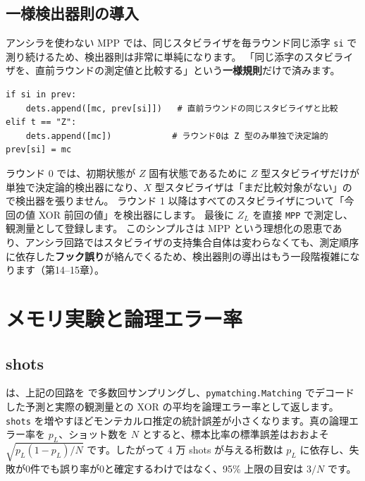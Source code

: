 \subsection{一様検出器則の導入}

アンシラを使わない MPP では、同じスタビライザを毎ラウンド同じ添字 \texttt{si} で測り続けるため、検出器則は非常に単純になります。
「同じ添字のスタビライザを、直前ラウンドの測定値と比較する」という\textbf{一様規則}だけで済みます。

\begin{lstlisting}[caption={一様検出器則（\codepath{src/stages/01_mpp/src/ftqc/surface_patch.py} の \texttt{mpp\_memory\_logical\_error} を抜粋）},label=lst:uniform_detector]
if si in prev:
    dets.append([mc, prev[si]])   # 直前ラウンドの同じスタビライザと比較
elif t == "Z":
    dets.append([mc])            # ラウンド0は Z 型のみ単独で決定論的
prev[si] = mc
\end{lstlisting}

ラウンド 0 では、初期状態が $Z$ 固有状態であるために $Z$ 型スタビライザだけが単独で決定論的検出器になり、$X$ 型スタビライザは「まだ比較対象がない」ので検出器を張りません。
ラウンド 1 以降はすべてのスタビライザについて「今回の値 XOR 前回の値」を検出器にします。
最後に $Z_L$ を直接 \texttt{MPP} で測定し、観測量として登録します。
このシンプルさは MPP という理想化の恩恵であり、アンシラ回路ではスタビライザの支持集合自体は変わらなくても、測定順序に依存した\textbf{フック誤り}が絡んでくるため、検出器則の導出はもう一段階複雑になります（第14–15章）。

\section{メモリ実験と論理エラー率}\label{sec:memory_exp}

\subsection{shots}

 は、上記の回路を  で多数回サンプリングし、\texttt{pymatching.Matching} でデコードした予測と実際の観測量との XOR の平均を論理エラー率として返します。
\texttt{shots} を増やすほどモンテカルロ推定の統計誤差が小さくなります。真の論理エラー率を $p_L$、ショット数を $N$ とすると、標本比率の標準誤差はおおよそ $\sqrt{p_L(1-p_L)/N}$ です。したがって 4 万 shots が与える桁数は $p_L$ に依存し、失敗が0件でも誤り率が0と確定するわけではなく、95\% 上限の目安は $3/N$ です。


